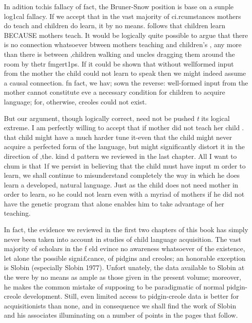 In adition to:his fallacy of fact, the Bruner-Snow position is base on a sunple log1cal fallacy. If we accept that in the vast majority of ci.rcumstances mothers do teach and children do learn, it by no means. follows that children learn BECAUSE mothers teach. It would be logically quite possible to argue that there is no connection whatso\-ever btween mothers teaching and children's , any more than there is between ,children walking and uncles dragging them around the room by thetr fmgert1ps. If it could be shown that without well\-formed input from the mother the child could not learn to speak then we might indeed assume a causal connection. fn fact, we hav; sown the reverse: well-formed input from the mother cannot constitute eve a necessary condition for children to acquire language; for, otherwise, creoles could not exist.

But our argument, though logically correct, need not be pushed \textit{t} its logical extreme. I am perfectly willing to accept that if mother did not teach her child . that child might have a much harder tune  it-even that the child might never acquire a perfected form of the language, but might significantly distort it in the direction of ,the. kind d pattern we reviewed in the last chapter. All I want to chum is that 1f we persist in believing that the child must have input m order to learn, we shall continue to misunderstand completely the way in which he does learn a developed, natural language. Just as
the child does not need mother in order to learn, so he could not learn even with a myriad of mothers if he did not have the genetic program that alone enables him to take advantage of her teaching.

In fact, the evidence we reviewed in the first two chapters of this book has simply never been taken into account in studies of child language acquisition. The vast majority of scholars in the f eld evince no awareness whatsoever of the existence, let alone the possible signi£cance, of pidgins and creoles; an honorable exception is Slobin (especially Slobin 1977). Unfort unately, the data available to Slobin at the  were by no means as ample as those given in the present volume; moreover, he makes the common mistake of supposing  to be paradigmatic of normal pidgin-creole development. Still, even limited access to pidgin-creole data is better for acquisitionists than none, and in consequence we shall find the work of Slobin and his associates illuminating on a number of points in the pages that
follow.

